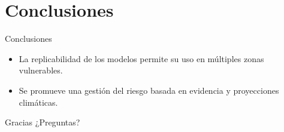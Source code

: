 \documentclass{beamer}
\begin{document}
\section{Conclusiones}
\begin{frame}{Conclusiones}
  \small
  \begin{itemize}
    \item La replicabilidad de los modelos permite su uso en múltiples zonas vulnerables.
    \item Se promueve una gestión del riesgo basada en evidencia y proyecciones climáticas.
  \end{itemize}
\end{frame}

\begin{frame}{Gracias}
  \centering
  \Large ¿Preguntas?
\end{frame}
\end{document}
